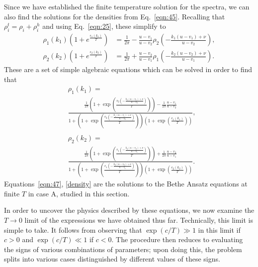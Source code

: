\documentclass[aps,pra,
superscriptaddress,
reprint,twocolumn,preprintnumbers,
amsmath,amssymb,
nofootinbib]{revtex4-1}
\begin{document}
Since we have established the finite temperature solution for the spectra, we can also find the solutions for the densities from Eq.~\eqref{eqn:45}. Recalling that $\rho_i^t = \rho_i + \rho_i^h$ and using Eq.~\eqref{eqn:25}, these simplify to
        \begin{align}
        \rho_1(k_1) \left(1 + e^{\frac{\epsilon_1(k_1)}{T}} \right) &= \frac{1}{2\pi} - \frac{u - v_1}{u - v_2} \rho_2 \left(- \frac{k_1(u - v_1) + \nu}{u - v_2}\right), \nonumber \\
        \rho_2(k_2) \left(1 + e^{\frac{\epsilon_2(k_2)}{T}} \right) &= \frac{1}{2\pi} + \frac{u - v_2}{u - v_1} \rho_1 \left(- \frac{k_2(u - v_2) + \nu}{u - v_1}\right).
        \end{align}
      	These are a set of simple algebraic equations which can be solved in order to find that 
        \begin{align}
        \label{density}
        &\rho_1(k_1) = \nonumber \\
        &\frac{\frac{1}{2\pi}\left(1 + \exp\left(\frac{\epsilon_2\left(-\frac{k_1 (u - v_1) + \nu}{u - v_2}\right)}{T} \right) \right)- \frac{1}{2\pi}\frac{u - v_1}{u - v_2}}{1 + \left(1 + \exp\left(\frac{\epsilon_2\left(-\frac{k_1 (u - v_1) + \nu}{u - v_2}\right)}{T} \right) \right)\left(1 + \exp\left(\frac{\epsilon_1(k_1)}{T} \right) \right) }, \nonumber \\
\nonumber \\
        &\rho_2(k_2) = \nonumber \\
        &\frac{\frac{1}{2\pi}\left(1 + \exp\left(\frac{\epsilon_1\left(-\frac{k_2 (u - v_2) + \nu}{u - v_1} \right)}{T} \right) \right) + \frac{1}{2\pi}\frac{u - v_2}{u - v_1}}{1 + \left(1 + \exp\left(\frac{\epsilon_1\left(-\frac{k_2(u-v_2)+\nu}{u-v_1}\right)}{T} \right)\right)\left(1 + \exp\left(\frac{\epsilon_2(k_2)}{T} \right)\right)}.
        \end{align}
Equations~\eqref{eqn:47}, \eqref{density} are the solutions to the Bethe Ansatz equations at finite $T$ in case A, studied in this section.

In order to uncover the physics described by these equations, we now examine the $T \rightarrow 0$ limit of the expressions we have obtained thus far. Technically, this limit is simple to take. It follows from observing that $\exp(c/T) \gg 1$ in this limit if $c>0$ and $\exp(c/T) \ll 1$ if $c<0$. The procedure then reduces to evaluating the signs of various combinations of parameters; upon doing this, the problem splits into various cases distinguished by different values of these signs. 
\end{document}
